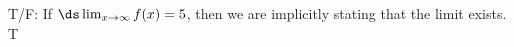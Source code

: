 {T/F: If $\ds \lim_{x\to \infty} f(x) = 5$, then we are implicitly stating that the limit exists.}
{T}
